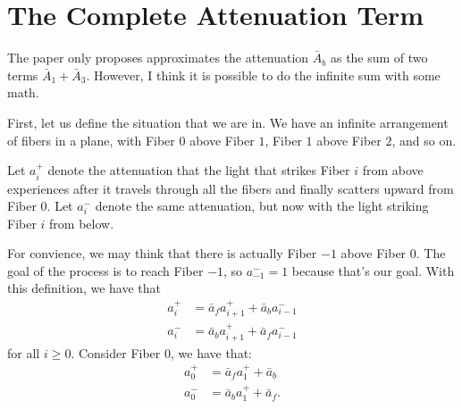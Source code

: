 \documentclass[10pt]{article}
\begin{document}
  \section{The Complete Attenuation Term}

  The paper only proposes approximates the attenuation $\bar{A}_b$ as the sum of two terms $\bar{A}_1 + \bar{A}_3$.  However, I think it is possible to do the infinite sum with some math.

  First, let us define the situation that we are in.  We have an infinite arrangement of fibers in a plane, with Fiber $0$ above Fiber $1$, Fiber $1$ above Fiber $2$, and so on.
  \begin{center}
  \end{center}

  Let $a_i^+$ denote the attenuation that the light that strikes Fiber $i$ from above experiences after it travels through all the fibers and finally scatters upward from Fiber $0$.  Let $a_i^-$ denote the same attenuation, but now with the light striking Fiber $i$ from below.

  For convience, we may think that there is actually Fiber $-1$ above Fiber $0$.  The goal of the process is to reach Fiber $-1$, so $a^{-}_{-1} = 1$ because that's our goal.  With this definition, we have that
  \begin{align*}
  	a_i^{+} &= \bar{a}_f a_{i+1}^+ + \bar{a}_b a_{i-1}^- \\
  	a_i^{-} &= \bar{a}_b a_{i+1}^+ + \bar{a}_f a_{i-1}^-
  \end{align*}
  for all $i \geq 0$.  Consider Fiber $0$, we have that:
  \begin{align}
    a_0^{+} &= \bar{a}_f a_{1}^+ + \bar{a}_b \label{a0plus} \\
  	a_0^{-} &= \bar{a}_b a_{1}^+ + \bar{a}_f. \label{a0minus}
  \end{align}
\end{document}
